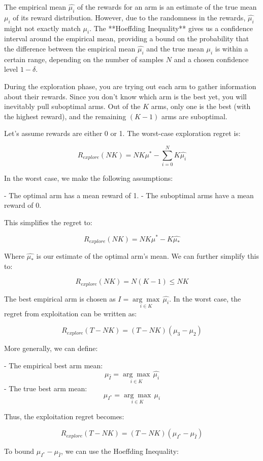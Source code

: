 The empirical mean $\hat{\mu_i}$ of the rewards for an arm is an estimate of the true mean $\mu_i$ of its reward distribution. However, due to the randomness in the rewards, $\hat{\mu_i}$ might not exactly match $\mu_i$. The **Hoeffding Inequality** gives us a confidence interval around the empirical mean, providing a bound on the probability that the difference between the empirical mean $\hat{\mu_i}$ and the true mean $\mu_i$ is within a certain range, depending on the number of samples $N$ and a chosen confidence level $1 - \delta$.

During the exploration phase, you are trying out each arm to gather information about their rewards. Since you don't know which arm is the best yet, you will inevitably pull suboptimal arms. Out of the $K$ arms, only one is the best (with the highest reward), and the remaining $(K-1)$ arms are suboptimal.

Let’s assume rewards are either 0 or 1. The worst-case exploration regret is:

$$
    R_{explore}(NK) = NK\mu^* - \sum_{i=0}^NK \hat{\mu_i}
$$

In the worst case, we make the following assumptions:

- The optimal arm has a mean reward of 1.
- The suboptimal arms have a mean reward of 0.

This simplifies the regret to:

$$
    R_{explore}(NK) = NK\mu^* - K \hat{\mu_*}
$$

Where $\hat{\mu_*}$ is our estimate of the optimal arm's mean. We can further simplify this to:

$$
    R_{explore}(NK) = N(K-1) \leq NK
$$

The best empirical arm is chosen as $I = \underset{i \in K}{\arg\max} \, \hat{\mu_i}$. In the worst case, the regret from exploitation can be written as:

$$
    R_{explore}(T-NK) = (T-NK)(\mu_3 - \mu_2)
$$

More generally, we can define:

- The empirical best arm mean:
$$
    \mu_{\hat{I}} = \underset{i \in K}{\arg\max} \, \hat{\mu_i}
$$
- The true best arm mean:
$$
    \mu_{I^*} = \underset{i \in K}{\arg\max} \, \mu_i
$$

Thus, the exploitation regret becomes:

$$
    R_{explore}(T-NK) = (T-NK)(\mu_{I^*} - \mu_{\hat{I}})
$$

To bound $\mu_{I^*} - \mu_{\hat{I}}$, we can use the Hoeffding Inequality:

